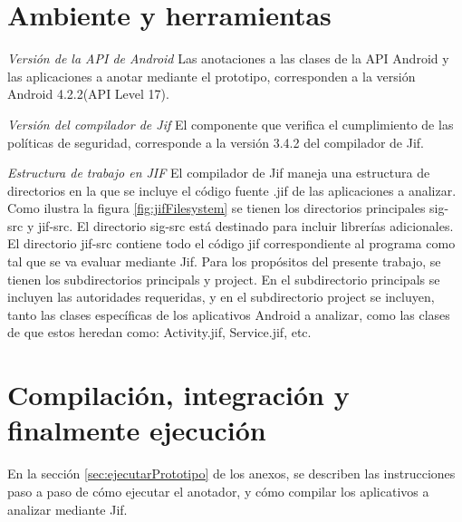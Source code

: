 \section{Ambiente y herramientas}
\textit{Versión de la API de Android}\newline
Las anotaciones a las clases de la API Android y las aplicaciones a anotar
mediante el prototipo, corresponden a la versión Android 4.2.2(API Level 17).

\textit{Versión del compilador de Jif}\newline
El componente que verifica el cumplimiento de las políticas de seguridad,
corresponde a la versión 3.4.2 del compilador de Jif.

\textit{Estructura de trabajo en JIF}\newline
El compilador de Jif maneja una estructura de directorios en la que se incluye
el código fuente .jif de las aplicaciones a analizar. Como ilustra la figura
\ref{fig:jifFilesystem} se tienen los directorios principales sig-src y jif-src.
El directorio sig-src está destinado para incluir librerías adicionales.\newline 
El directorio jif-src contiene todo el código jif correspondiente al programa
como tal que se va evaluar mediante Jif. Para los propósitos del presente
trabajo, se tienen los subdirectorios principals y project. En el subdirectorio
principals se incluyen las autoridades requeridas, y en el subdirectorio
project se incluyen, tanto las clases específicas de los aplicativos Android a
analizar, como las clases de que estos heredan como: Activity.jif, Service.jif,
etc.

\section{Compilación, integración y finalmente ejecución }
En la sección \ref{sec:ejecutarPrototipo} de los anexos, se describen las
instrucciones paso a paso de cómo ejecutar el anotador, y cómo compilar los
aplicativos a analizar mediante Jif.
